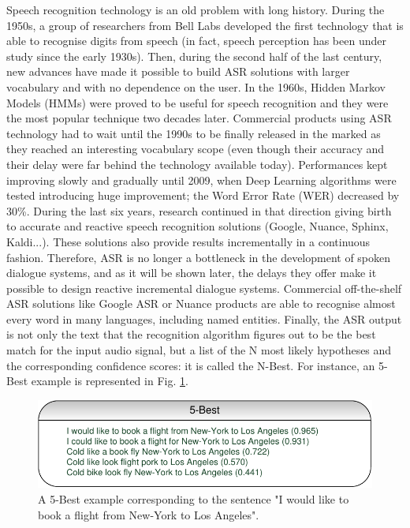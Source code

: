 		Speech recognition technology is an old problem with long history. During the 1950s, a group of researchers from Bell Labs developed the first technology that is able to recognise digits from speech (in fact, speech perception has been under study since the early 1930s). Then, during the second half of the last century, new advances have made it possible to build ASR solutions with larger vocabulary and with no dependence on the user. In the 1960s, Hidden Markov Models (HMMs) were proved to be useful for speech recognition \cite{Gales2007} and they were the most popular technique two decades later. Commercial products using ASR technology had to wait until the 1990s to be finally released in the marked as they reached an interesting vocabulary scope (even though their accuracy and their delay were far behind the technology available today). Performances kept improving slowly and gradually until 2009, when Deep Learning algorithms were tested \cite{Mohamed2009,Deng2013} introducing huge improvement; the Word Error Rate (WER) decreased by 30\%. During the last six years, research continued in that direction giving birth to accurate and reactive speech recognition solutions (Google, Nuance, Sphinx, Kaldi...). These solutions also provide results incrementally in a continuous fashion. Therefore, ASR is no longer a bottleneck in the development of spoken dialogue systems, and as it will be shown later, the delays they offer make it possible to design reactive incremental dialogue systems. Commercial off-the-shelf ASR solutions like Google ASR or Nuance products are able to recognise almost every word in many languages, including named entities. Finally, the ASR output is not only the text that the recognition algorithm figures out to be the best match for the input audio signal, but a list of the N most likely hypotheses and the corresponding confidence scores: it is called the N-Best. For instance, an 5-Best example is represented in Fig. \ref{fig:dialchain}.
		
		\begin{figure}
			\centering
			\includegraphics[scale=1]{figures/5BestEx.pdf}
			\caption{A 5-Best example corresponding to the sentence "I would like to book a flight from New-York to Los Angeles".}
			\label{fig:dialchain}
		\end{figure}
		
